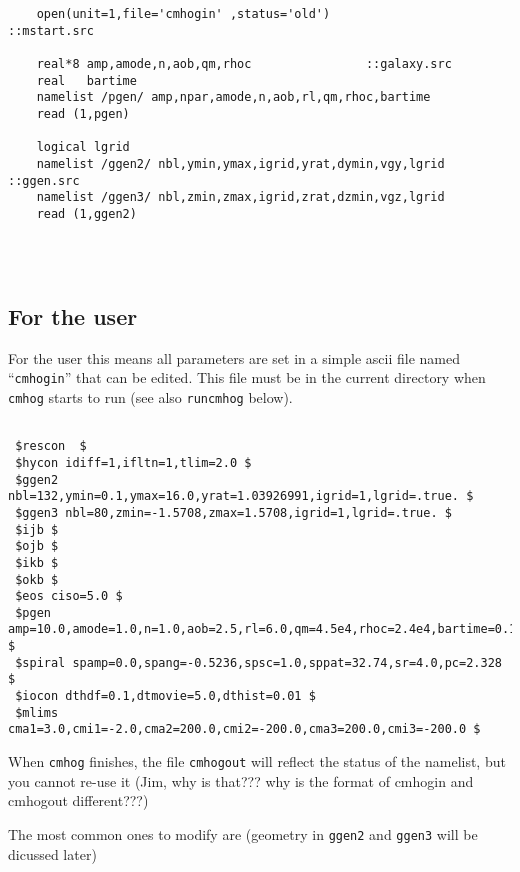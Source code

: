 \documentclass[11pt]{article}
\begin{document}
\begin{verbatim}
    open(unit=1,file='cmhogin' ,status='old')                     ::mstart.src

    real*8 amp,amode,n,aob,qm,rhoc				  ::galaxy.src
    real   bartime
    namelist /pgen/ amp,npar,amode,n,aob,rl,qm,rhoc,bartime       
    read (1,pgen)                                                 

    logical lgrid
    namelist /ggen2/ nbl,ymin,ymax,igrid,yrat,dymin,vgy,lgrid	  ::ggen.src
    namelist /ggen3/ nbl,zmin,zmax,igrid,zrat,dzmin,vgz,lgrid
    read (1,ggen2)




\end{verbatim}

\subsection{For the user}

For the user this means all parameters are set in a simple ascii file
named ``{\tt cmhogin}'' that can be edited. This file must be in the
current directory when {\tt cmhog} starts to run (see also
{\tt runcmhog} below).

\begin{verbatim}

 $rescon  $
 $hycon idiff=1,ifltn=1,tlim=2.0 $
 $ggen2 nbl=132,ymin=0.1,ymax=16.0,yrat=1.03926991,igrid=1,lgrid=.true. $
 $ggen3 nbl=80,zmin=-1.5708,zmax=1.5708,igrid=1,lgrid=.true. $
 $ijb $
 $ojb $
 $ikb $
 $okb $
 $eos ciso=5.0 $
 $pgen amp=10.0,amode=1.0,n=1.0,aob=2.5,rl=6.0,qm=4.5e4,rhoc=2.4e4,bartime=0.1 $
 $spiral spamp=0.0,spang=-0.5236,spsc=1.0,sppat=32.74,sr=4.0,pc=2.328 $
 $iocon dthdf=0.1,dtmovie=5.0,dthist=0.01 $
 $mlims cma1=3.0,cmi1=-2.0,cma2=200.0,cmi2=-200.0,cma3=200.0,cmi3=-200.0 $

\end{verbatim}

When {\tt cmhog} finishes, the file {\tt cmhogout} will reflect the status
of the namelist, but you cannot re-use it (Jim, why is that??? why is the
format of cmhogin and cmhogout different???)


The most common ones to modify are (geometry in {\tt ggen2} and {\tt ggen3}
will be dicussed later)
\end{document}
